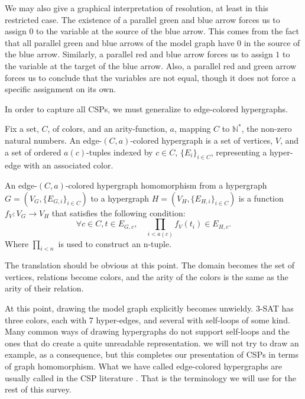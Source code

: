 We may also give a graphical interpretation of resolution, at least in this restricted case. The existence of a parallel green and blue arrow forces us to assign $0$ to the variable at the source of the blue arrow. This comes from the fact that all parallel green and blue arrows of the model graph have $0$ in the source of the blue arrow. Similarly, a parallel red and blue arrow forces us to assign $1$ to the variable at the target of the blue arrow. Also, a parallel red and green arrow forces us to conclude that the variables are not equal, though it does not force a specific assignment on its own.

In order to capture all CSPs, we must generalize to edge-colored hypergraphs. 

\begin{definition}
Fix a set, $C$, of colors, and an arity-function, $a$, mapping $C$ to $\mathbb{N}^*$, the non-zero natural numbers. An edge-$(C, a)$-colored hypergraph is a set of vertices, $V$, and a set of ordered $a(c)$-tuples indexed by $c \in C$, $\{E_i\}_{i\in C}$, representing a hyper-edge with an associated color. 
\end{definition}

\begin{definition}
An edge-$(C, a)$-colored hypergraph homomorphism from a hypergraph $G = (V_G, \{E_{G,i}\}_{i\in C})$ to a hypergraph $H = (V_H, \{E_{H, i}\}_{i\in C})$ is a function $f_V: V_G \rightarrow V_H$ that satisfies the following condition:
\begin{equation}
    \forall c \in C, t \in E_{G, c}, \quad \prod_{i<a(c)} f_V(t_i) \in E_{H, c}.    
\end{equation}
Where $\prod_{i<n}$ is used to construct an n-tuple.
\end{definition}

The translation should be obvious at this point. The domain becomes the set of vertices, relations become colors, and the arity of the colors is the same as the arity of their relation.

At this point, drawing the model graph explicitly becomes unwieldy. 3-SAT has three colors, each with 7 hyper-edges, and several with self-loops of some kind. Many common ways of drawing hypergraphs do not support self-loops and the ones that do create a quite unreadable representation. we will not try to draw an example, as a consequence, but this completes our presentation of CSPs in terms of graph homomorphism. What we have called edge-colored hypergraphs are usually called  in the CSP literature \citep{feder1998computational}. That is the terminology we will use for the rest of this survey.

